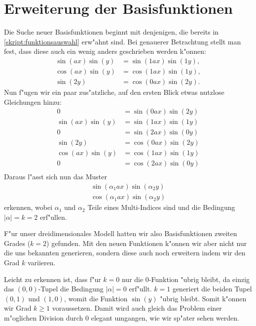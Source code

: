 \section{Erweiterung der Basisfunktionen\label{section:lorenz2:basic_function}}
Die Suche neuer Basisfunktionen beginnt mit denjenigen, die bereits 
in \cref{skript:funktionsauswahl} erw"ahnt sind. Bei genauerer Betrachtung 
stellt man fest, dass diese auch ein wenig anders geschrieben werden k"onnen:
\begin{align*}
\sin(ax)\sin(y) &= \sin(1ax)\sin(1y),\\
\cos(ax)\sin(y) &= \cos(1ax)\sin(1y),\\
\sin(2y) &= \cos(0ax)\sin(2y).
\end{align*}
Nun f"ugen wir ein paar zus"atzliche, auf den ersten Blick etwas nutzlose
Gleichungen hinzu:
\begin{align*}
0 &= \sin(0ax)\sin(2y) \\
\sin(ax)\sin(y) &= \sin(1ax)\sin(1y)\\
0 &= \sin(2ax)\sin(0y) \\
\sin(2y) &= \cos(0ax)\sin(2y)\\
\cos(ax)\sin(y) &= \cos(1ax)\sin(1y)\\
0 &= \cos(2ax)\sin(0y)\\
\end{align*}
Daraus l"asst sich nun das Muster
\begin{equation}
\begin{split}
\sin(\alpha_1 ax)\sin(\alpha_2 y) \\
\cos(\alpha_1 ax)\sin(\alpha_2 y)
\end{split}
\label{equation:lorenz2:basic-functions}
\end{equation}
erkennen, wobei $\alpha_1$ und $\alpha_2$ Teile eines Multi-Indices sind und 
die Bedingung $|\alpha| = k = 2$ erf"ullen.

F"ur unser dreidimensionales Modell hatten wir also Basisfunktionen zweiten 
Grades ($k = 2$) gefunden. Mit den neuen Funktionen k"onnen wir aber nicht nur 
die uns bekannten generieren, sondern diese auch noch erweitern indem wir den 
Grad $k$ variieren.

Leicht zu erkennen ist, dass f"ur $k = 0$ nur die $0$-Funktion 
"ubrig bleibt, da einzig das $(0, 0)$-Tupel die Bedingung $|\alpha| = 0$ 
erf"ullt. $k = 1$ generiert die beiden Tupel $(0, 1)$ und $(1, 0)$, womit die 
Funktion $\sin(y)$ "ubrig bleibt. Somit k"onnen wir Grad $k \geq 1$ 
voraussetzen. Damit wird auch gleich das Problem einer m"oglichen Division 
durch $0$ elegant umgangen, wie wir sp"ater sehen werden.
